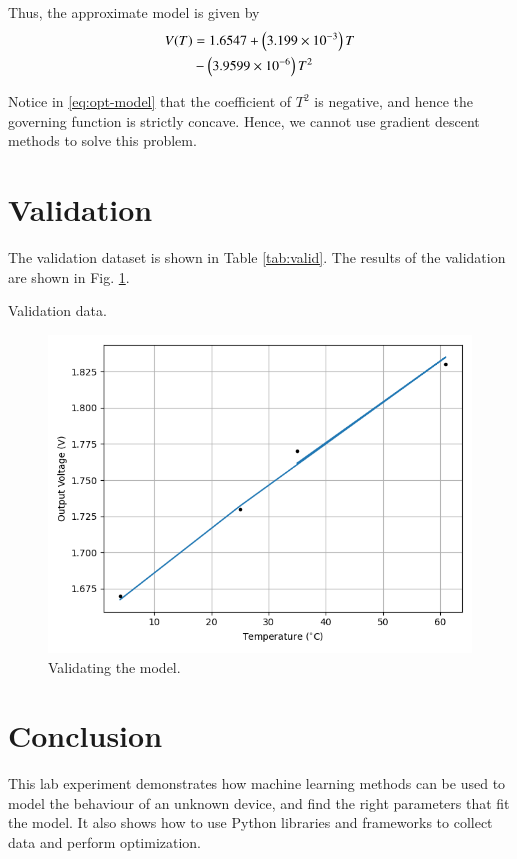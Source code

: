 \documentclass[journal,12pt,twocolumn]{IEEEtran}
\begin{document}
Thus, the approximate model is given by
\begin{align}
    V(T) &= 1.6547 + \left(3.199\times10^{-3}\right)T \nonumber \\
         &- \left(3.9599\times10^{-6}\right)T^2
    \label{eq:opt-model}
\end{align}

Notice in \eqref{eq:opt-model} that the coefficient of $T^2$ is negative, and 
hence the governing function is strictly concave. Hence, we cannot use gradient 
descent methods to solve this problem.

\section{Validation}
The validation dataset is shown in Table \ref{tab:valid}. The results of the 
validation are shown in Fig. \ref{fig:valid}.
\begin{table}[!ht]
    \centering
    
    \caption{Validation data.}
    \label{tab:valid}
\end{table}
\begin{figure}[!ht]
    \centering
    \includegraphics[width=\columnwidth]{figs/valid.png}
    \caption{Validating the model.}
    \label{fig:valid}
\end{figure}

\section{Conclusion}

This lab experiment demonstrates how machine learning methods can be used to 
model the behaviour of an unknown device, and find the right parameters that 
fit the model. It also shows how to use Python libraries and frameworks to
collect data and perform optimization.
\end{document}
